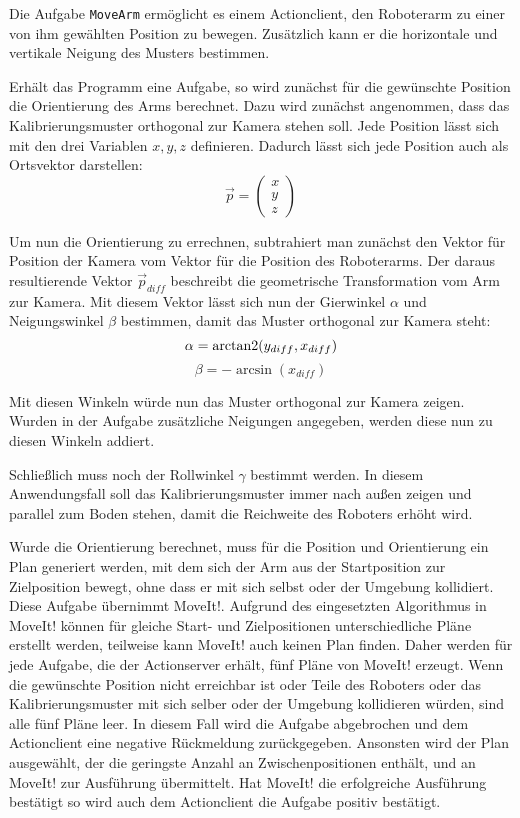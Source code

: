 Die Aufgabe \texttt{MoveArm} ermöglicht es einem Actionclient, den Roboterarm zu einer von ihm gewählten Position zu bewegen. Zusätzlich kann er die horizontale und vertikale Neigung des Musters bestimmen.

Erhält das Programm eine Aufgabe, so wird zunächst für die gewünschte Position die Orientierung des Arms berechnet. Dazu wird zunächst angenommen, dass das Kalibrierungsmuster orthogonal zur Kamera stehen soll. Jede Position lässt sich mit den drei Variablen $x, y, z$ definieren. Dadurch lässt sich jede Position auch als Ortsvektor darstellen:
\begin{equation}
	\vec{p} = 
	\begin{pmatrix}
		x\\
		y\\
		z
	\end{pmatrix}
\end{equation}

Um nun die Orientierung zu errechnen, subtrahiert man zunächst den Vektor für Position der Kamera vom Vektor für die Position des Roboterarms. Der daraus resultierende Vektor $\vec{p}_{diff}$ beschreibt die geometrische Transformation vom Arm zur Kamera. Mit diesem Vektor lässt sich nun der Gierwinkel $\alpha$ und Neigungswinkel $\beta$ bestimmen, damit das Muster orthogonal zur Kamera steht:
\begin{equation}
	\alpha = \operatorname{arctan2}(y_{diff}, x_{diff})
\end{equation}
\begin{equation}
	\beta = -\arcsin(x_{diff})
\end{equation}

Mit diesen Winkeln würde nun das Muster orthogonal zur Kamera zeigen. Wurden in der Aufgabe zusätzliche Neigungen angegeben, werden diese nun zu diesen Winkeln addiert.

Schließlich muss noch der Rollwinkel $\gamma$ bestimmt werden. In diesem Anwendungsfall soll das Kalibrierungsmuster immer nach außen zeigen und parallel zum Boden stehen, damit die Reichweite des Roboters erhöht wird.


Wurde die Orientierung berechnet, muss für die Position und Orientierung ein Plan generiert werden, mit dem sich der Arm aus der Startposition zur Zielposition bewegt, ohne dass er mit sich selbst oder der Umgebung kollidiert. Diese Aufgabe übernimmt MoveIt!. Aufgrund des eingesetzten Algorithmus in MoveIt! können für gleiche Start- und Zielpositionen unterschiedliche Pläne erstellt werden, teilweise kann MoveIt! auch keinen Plan finden. Daher werden für jede Aufgabe, die der Actionserver erhält, fünf Pläne von MoveIt! erzeugt. Wenn die gewünschte Position nicht erreichbar ist oder Teile des Roboters oder das Kalibrierungsmuster mit sich selber oder der Umgebung kollidieren würden, sind alle fünf Pläne leer. In diesem Fall wird die Aufgabe abgebrochen und dem Actionclient eine negative Rückmeldung zurückgegeben. Ansonsten wird der Plan ausgewählt, der die geringste Anzahl an Zwischenpositionen enthält, und an MoveIt! zur Ausführung übermittelt. Hat MoveIt! die erfolgreiche Ausführung bestätigt so wird auch dem Actionclient die Aufgabe positiv bestätigt.

